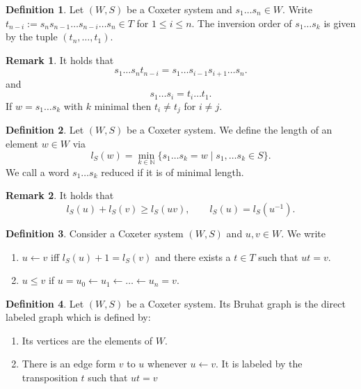 \documentclass{amsart}
\theoremstyle{definition}
\newtheorem{definition}{Definition}
\newtheorem*{remark}{Remark}
\begin{document}
\begin{definition}
	Let $(W,S)$ be a Coxeter system and $s_1\dotsc s_n \in W$. Write
	$t_{n-i}:= s_n s_{n-1} \dotsc s_{n-i} \dotsc s_n \in T$ for $1 \leq i \leq n$. The inversion order of $s_1\dotsc s_k$ is given by the tuple $(t_n, \dotsc , t_1)$.
\end{definition}

\begin{remark}
	It holds that
	$$
		s_1 \dotsc s_n t_{n-i} = s_1 \dotsc s_{i-1} s_{i+1} \dotsc s_n.
	$$
	and
	$$
		s_1 \dotsc s_i = t_i \dotsc t_1.
	$$	
	If $w= s_1\dotsc s_k$ with $k$ minimal then $t_i \neq t_j$ for $i\neq j$.
\end{remark}
	
	
\begin{definition}
	Let $(W,S)$ be a Coxeter system.
	We define the length of an element $w\in W$ via
	$$
		l_S(w)= \min_{k\in \mathbb N}\{ s_1 \dotsc s_k= w \mid s_1,\dotsc s_k \in S\}.
	$$
	We call a word $s_1\dotsc s_k$ reduced if it is of minimal length.
\end{definition}

\begin{remark}
	It holds that
	$$
		l_S(u)+l_S(v) \geq l_S(uv), \qquad l_S(u) = l_S (u^{-1}).
	$$
\end{remark}

\begin{definition}
	Consider a Coxeter system $(W,S)$ and $u,v \in W$.
	We write
	\begin{enumerate}
		\item $u \leftarrow v$ iff $l_S(u) +1= l_S(v)$ and there exists a $t\in T$ such that $ut=v$.
		\item $u\leq v$ if $u=u_0 \leftarrow u_1 \leftarrow \dotsc \leftarrow u_n =v$.
	\end{enumerate}
\end{definition}

\begin{definition}
	Let $(W,S)$ be a Coxeter system.
	Its Bruhat graph is the direct labeled graph which is defined by:
	\begin{enumerate}
		\item Its vertices are the elements of $W$.
		\item There is an edge form $v$ to $u$ whenever $u \leftarrow v$. It is labeled by the transposition $t$ such that $ut=v$
	\end{enumerate}
\end{definition}
\end{document}
